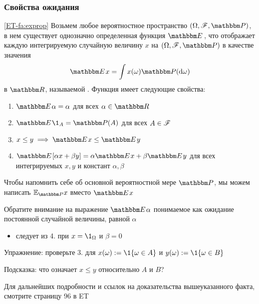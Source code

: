 \begin{frame}\frametitle{Свойства ожидания}

    \vspace{2em}
    \Fact\eqref{ET-fa:exprop}
        Возьмем любое вероятностное пространство $(\Omega, \fF, \PP)$, в нем существует 
        однозначно определенная функция $\EE$, что отображает каждую интегрируемую 
        случайную величину $x$
        на $(\Omega, \fF, \PP)$ в качестве значения
        \begin{equation}
            \label{eq:ealm}
            \EE x = \int x(\omega) \PP(\diff \omega)
        \end{equation}
        в $\RR$, называемой .
        Функция имеет следующие свойства:
        \begin{enumerate}
            \item $\EE \alpha = \alpha$ для всех $\alpha \in \RR$
            \item $\EE \1_A = \PP(A)$ для всех $A \in \mathscr F$
            \item $x \leq y \implies \EE x \leq \EE y$
            \item $\EE [ \alpha x + \beta y ] = \alpha \EE x + \beta \EE y$ для
                всех интегрируемых $x, y$ и констант $\alpha, \beta$
        \end{enumerate}
        
\end{frame}

\begin{frame}

    \vspace{2em}
    Чтобы напомнить себе об основной вероятностной мере $\PP$, мы можем
      написать $\mathbb{E}_{\PP} x$ вместо $\EE x$
     
    \vspace{.7em}
    Обратите внимание на выражение $\EE \alpha$ понимаемое как ожидание постоянной 
    случайной величины, равной $\alpha$
     \begin{itemize}
         \item следует из 4. при $x = \1_{\Omega}$ и $\beta = 0$
     \end{itemize}
     
\end{frame}

\begin{frame}

    \vspace{2em}
    Упражнение: проверьте 3. для $x(\omega) := \1\{\omega \in A\}$ и 
    $y(\omega) := \1\{\omega \in B\}$ 

    Подсказка: что означает $x \leq y$ относительно $A$ и $B$?
    
    Для дальнейших подробности и ссылок на доказательства вышеуказанного факта, 
    смотрите страницу 96 в ET
    
\end{frame}

